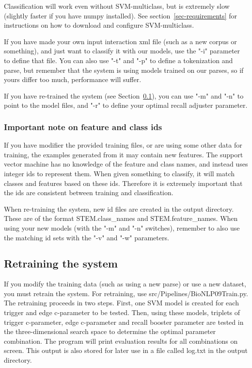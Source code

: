\documentclass[a4paper,12pt]{article}
\begin{document}
Classification will work even without SVM-multiclass, but is extremely slow
(slightly faster if you have numpy installed). See
section~\ref{sec-requirements} for instructions on how to download and configure SVM-multiclass.

If you have made your own input interaction xml file (such as a new corpus or
something), and just want to classify it with our models, use the "-i" parameter
to define that file. You can also use "-t" and "-p" to define a tokenization and
parse, but remember that the system is using models trained on our parses, so if
yours differ too much, performance will suffer.

If you have re-trained the system (see Section~\ref{sec-retraining}), you can
use "-m" and "-n" to point to the model files, and "-r" to define your optimal 
recall adjuster parameter.

\subsubsection{Important note on feature and class ids}

If you have modifier the provided training files, or are using some other data
for training, the examples generated from it may contain new features. The
support vector machine has no knowledge of the feature and class names, and
instead uses integer ids to represent them. When given something to classify, it
will match classes and features based on these ids. Therefore it is extremely
important that the ids are consistent between training and classification.

When re-training the system, new id files are created in the output directory.
These are of the format STEM.class\_names and STEM.feature\_names. When using
your new models (with the "-m" and "-n" switches), remember to also use the
matching id sets with the "-v" and "-w" parameters.

\subsection{Retraining the system}
\label{sec-retraining}

If you modify the training data (such as using a new parse) or use a new dataset,
you must retrain the system. For retraining, use src/Pipelines/BioNLP09Train.py.
The retraining proceeds in two steps. First, one SVM model is created for each
trigger and edge c-parameter to be tested. Then, using these models, triplets of
trigger c-parameter, edge c-parameter and recall booster parameter are tested in
the three-dimensional search space to determine the optimal parameter
combination. The program will print evaluation results for all combinations on
screen. This output is also stored for later use in a file called log.txt in the
output directory.
\end{document}
